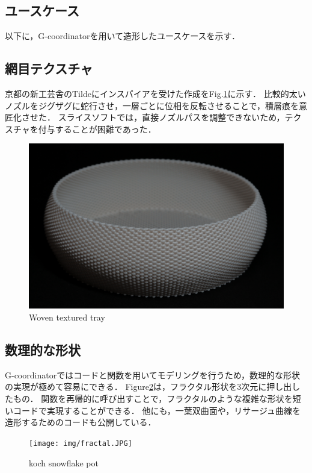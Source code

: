 \documentclass{article}
\begin{document}
\begin{twocolumn}
\section{ユースケース}
以下に，G-coordinatorを用いて造形したユースケースを示す．

\subsection{網目テクスチャ}

京都の新工芸舎\cite{shinkogeisha}のTilde\cite{tildeprinted}にインスパイアを受けた作成をFig.\ref{fig:WaveTray}に示す．
比較的太いノズルをジグザグに蛇行させ，一層ごとに位相を反転させることで，積層痕を意匠化させた．
スライスソフトでは，直接ノズルパスを調整できないため，テクスチャを付与することが困難であった．

\begin{figure}[htbp]
  \includegraphics[width=\linewidth]{img/wave_tray.JPG}
  \caption{Woven textured tray}
  \label{fig:WaveTray}
\end{figure}

\subsection{数理的な形状}\label{sec:mathmaticalShape}
G-coordinatorではコードと関数を用いてモデリングを行うため，数理的な形状の実現が極めて容易にできる．
Figure\ref{fig:fractal}は，フラクタル形状を3次元に押し出したもの．
関数を再帰的に呼び出すことで，フラクタルのような複雑な形状を短いコードで実現することができる．
他にも，一葉双曲面や，リサージュ曲線を造形するためのコードも公開している．

\begin{figure}[htbp]
  \texttt{[image: img/fractal.JPG]}
  \caption{koch snowflake pot}
  \label{fig:fractal}
\end{figure}


\end{twocolumn}
\end{document}
